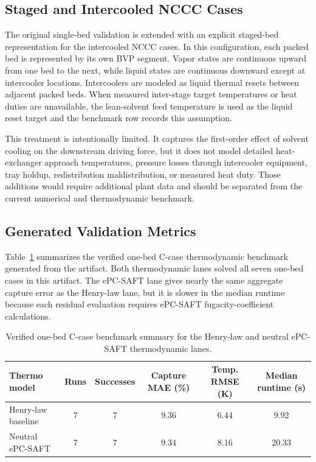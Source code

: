     \subsection{Staged and Intercooled NCCC Cases}
        The original single-bed validation is extended with an explicit staged-bed representation for the intercooled NCCC cases. In this configuration, each packed bed is represented by its own BVP segment. Vapor states are continuous upward from one bed to the next, while liquid states are continuous downward except at intercooler locations. Intercoolers are modeled as liquid thermal resets between adjacent packed beds. When measured inter-stage target temperatures or heat duties are unavailable, the lean-solvent feed temperature is used as the liquid reset target and the benchmark row records this assumption.

        This treatment is intentionally limited. It captures the first-order effect of solvent cooling on the downstream driving force, but it does not model detailed heat-exchanger approach temperatures, pressure losses through intercooler equipment, tray holdup, redistribution maldistribution, or measured heat duty. Those additions would require additional plant data and should be separated from the current numerical and thermodynamic benchmark.

    \subsection{Generated Validation Metrics}
        Table~\ref{tab:verified-one-bed-thermo-benchmark} summarizes the verified one-bed C-case thermodynamic benchmark generated from the  artifact. Both thermodynamic lanes solved all seven one-bed cases in this artifact. The ePC-SAFT lane gives nearly the same aggregate capture error as the Henry-law lane, but it is slower in the median runtime because each residual evaluation requires ePC-SAFT fugacity-coefficient calculations.

        \begin{table}[htbp]
            \centering
            \small
            \caption{Verified one-bed C-case benchmark summary for the Henry-law and neutral ePC-SAFT thermodynamic lanes.}
            \label{tab:verified-one-bed-thermo-benchmark}
            \renewcommand{\arraystretch}{1.2}
            \begin{tabular}{lccccc}
                \toprule
                \textbf{Thermo model} & \textbf{Runs} & \textbf{Successes} & \textbf{Capture MAE (\%)} & \textbf{Temp. RMSE (K)} & \textbf{Median runtime (s)} \\
                \midrule
                Henry-law baseline & 7 & 7 & 9.36 & 6.44 & 9.92 \\
                Neutral ePC-SAFT & 7 & 7 & 9.34 & 8.16 & 20.33 \\
                \bottomrule
            \end{tabular}
        \end{table}


